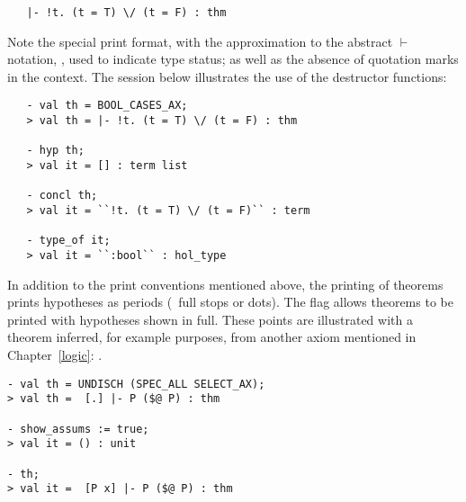 \begin{hol}
\begin{verbatim}
   |- !t. (t = T) \/ (t = F) : thm
\end{verbatim}
\end{hol}

\noindent
Note the special print format,
%
with the approximation
to the abstract $\vdash$ notation,
%
%
\ml{|-}, used to indicate \ML{} type  status; as well as the
absence of \HOL{} quotation marks
%
%
in the \ml{|-} context.  The session below illustrates the use of the
destructor functions:

\setcounter{sessioncount}{1}
\begin{session}
\begin{verbatim}
   - val th = BOOL_CASES_AX;
   > val th = |- !t. (t = T) \/ (t = F) : thm

   - hyp th;
   > val it = [] : term list

   - concl th;
   > val it = ``!t. (t = T) \/ (t = F)`` : term

   - type_of it;
   > val it = ``:bool`` : hol_type
\end{verbatim}
\end{session}

\noindent In addition to the print conventions mentioned above, the
printing of theorems prints hypotheses
as periods (\ie\ full stops or dots).  The flag 
 allows theorems
to be printed with hypotheses shown in full. These points are illustrated with a
theorem inferred, for example purposes, from another axiom mentioned
in Chapter~\ref{logic}: .

\setcounter{sessioncount}{1}
\begin{session}
\begin{verbatim}
- val th = UNDISCH (SPEC_ALL SELECT_AX);
> val th =  [.] |- P ($@ P) : thm

- show_assums := true;
> val it = () : unit

- th;
> val it =  [P x] |- P ($@ P) : thm
\end{verbatim}
\end{session}

